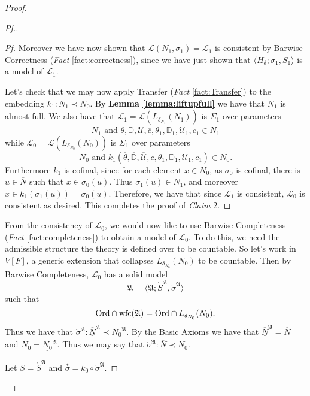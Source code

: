 \documentclass{amsart}
\theoremstyle{definition}
\theoremstyle{remark}
\newcommand{\D}{\mathbb{D}}
\newcommand{\N}{{\overline{N}}}
\newcommand{\U}{\mathcal{U}}
\newcommand{\Ord}{\textup{\ensuremath{\text{Ord}}}}
\DeclareMathOperator{\wfc}{wfc}
\begin{document}
\begin{proof}
\begin{proof}[Pf.]
\begin{proof}[Pf]
Moreover we have now shown that $\mathcal L(N_1, \sigma_1) = \mathcal L_1$ is consistent by Barwise Correctness (\textit{Fact} \ref{fact:correctness}), since we have just shown that $\langle H_{\delta}; \sigma_1, S_1 \rangle$ is a model of $\mathcal L_1$.

Let's check that we may now apply Transfer (\textit{Fact} \ref{fact:Transfer}) to the embedding $k_1:N_1 \prec N_0$. By \textbf{Lemma \ref{lemma:liftupfull}} we have that $N_1$ is almost full. We also have that $\mathcal L_1 = \mathcal L(L_{\delta_{N_1}}(N_1))$ is $\Sigma_1$ over parameters $$\text{$N_1$ and $\overline \theta, \overline{\D}, \overline{\U}, \overline c, \theta_1, \D_1, \U_1, c_1 \in N_1$}$$ while $\mathcal L_0=\mathcal L(L_{\delta_{N_0}}(N_0))$ is $\Sigma_1$ over parameters 
	$$\text{$N_0$ and $k_1(\overline \theta, \overline{\D}, \overline{\U}, \overline c, \theta_1, \D_1, \U_1, c_1) \in N_0$.}$$ 
Furthermore $k_1$ is cofinal, since for each element $x \in N_0$, as $\sigma_0$ is cofinal, there is $u \in \N$ such that $x \in \sigma_0(u)$. Thus $\sigma_1(u) \in N_1$, and moreover $x \in k_1(\sigma_1(u))=\sigma_0(u)$. Therefore, we have that since $\mathcal L_1$ is consistent, $\mathcal L_0$ is consistent as desired. This completes the proof of \textit{Claim} 2. \end{proof}

From the consistency of $\mathcal L_0$, we would now like to use Barwise Completeness (\textit{Fact} \ref{fact:completeness}) to obtain a model of $\mathcal L_0$. To do this, we need the admissible structure the theory is defined over to be countable. So let's work in $V[F]$, a generic extension that collapses $L_{\delta_{N_0}}(N_0)$ to be countable. Then by Barwise Completeness, $\mathcal L_0$ has a solid model 
	$$\mathfrak A = \langle \mathfrak A; \mathring{S}^{\mathfrak A}, \mathring{\sigma}^{\mathfrak A} \rangle$$ such that $$\Ord \cap \wfc(\mathfrak A) = \Ord \cap L_{\delta_{N_0}}(N_0).$$ 
Thus we have that $\mathring \sigma^{\mathfrak A}: \overline{\underline N}^{\mathfrak A} \prec \underline{N_0}^{\mathfrak A}$. By the \textsf{Basic Axioms} we have that $\overline{\underline N}^{\mathfrak A}=\N$ and $N_0=\underline{N_0}^{\mathfrak A}$. Thus we may say that  $\mathring \sigma^{\mathfrak A}: \N \prec N_0$. 

Let $S = \mathring{S}^{\mathfrak A}$ and $\overset{*} {\sigma}=k_0 \circ \mathring{\sigma}^{\mathfrak A}$. 


\end{proof}
\end{proof}
\end{document}
